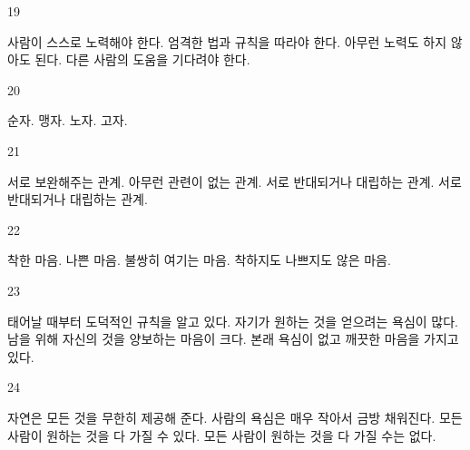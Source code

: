 \documentclass[fs9,seriesFre]{korfarm-base}
\begin{document}
\begin{kfSentenceUnit}{19}{}
\begin{kfChoices}
\kfChoice 사람이 스스로 노력해야 한다.
\kfChoice 엄격한 법과 규칙을 따라야 한다.
\kfChoice 아무런 노력도 하지 않아도 된다.
\kfChoice 다른 사람의 도움을 기다려야 한다.
\end{kfChoices}
\end{kfSentenceUnit}

\begin{kfSentenceUnit}{20}{}
\begin{kfChoices}
\kfChoice 순자.
\kfChoice 맹자.
\kfChoice 노자.
\kfChoice 고자.
\end{kfChoices}
\end{kfSentenceUnit}

\begin{kfSentenceUnit}{21}{}
\begin{kfChoices}
\kfChoice 서로 보완해주는 관계.
\kfChoice 아무런 관련이 없는 관계.
\kfChoice 서로 반대되거나 대립하는 관계.
\kfChoice 서로 반대되거나 대립하는 관계.
\end{kfChoices}
\end{kfSentenceUnit}

\begin{kfSentenceUnit}{22}{}
\begin{kfChoices}
\kfChoice 착한 마음.
\kfChoice 나쁜 마음.
\kfChoice 불쌍히 여기는 마음.
\kfChoice 착하지도 나쁘지도 않은 마음.
\end{kfChoices}
\end{kfSentenceUnit}

\begin{kfSentenceUnit}{23}{}
\begin{kfChoices}
\kfChoice 태어날 때부터 도덕적인 규칙을 알고 있다.
\kfChoice 자기가 원하는 것을 얻으려는 욕심이 많다.
\kfChoice 남을 위해 자신의 것을 양보하는 마음이 크다.
\kfChoice 본래 욕심이 없고 깨끗한 마음을 가지고 있다.
\end{kfChoices}
\end{kfSentenceUnit}

\begin{kfSentenceUnit}{24}{}
\begin{kfChoices}
\kfChoice 자연은 모든 것을 무한히 제공해 준다.
\kfChoice 사람의 욕심은 매우 작아서 금방 채워진다.
\kfChoice 모든 사람이 원하는 것을 다 가질 수 있다.
\kfChoice 모든 사람이 원하는 것을 다 가질 수는 없다.
\end{kfChoices}
\end{kfSentenceUnit}
\end{document}
